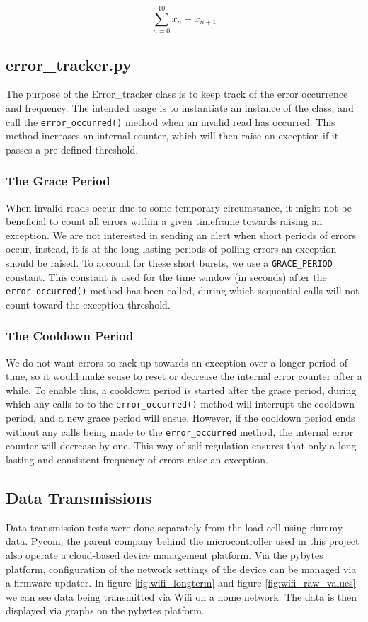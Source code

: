 $$\sum_{n=0}^{10} x_n - x_{n+1}$$


\subsection{error\_tracker.py}
The purpose of the Error\_tracker class is to keep track of the error occurrence and frequency. The intended usage is to instantiate an instance of the class, and call the \lstinline{error_occurred()} method when an invalid read has occurred. This method increases an internal counter, which will then raise an exception if it passes a pre-defined threshold.

\subsubsection{The Grace Period}
When invalid reads occur due to some temporary circumstance, it might not be beneficial to count all errors within a given timeframe towards raising an exception. We are not interested in sending an alert when short periods of errors occur, instead, it is at the long-lasting periods of polling errors an exception should be raised. To account for these short bursts, we use a \lstinline{GRACE_PERIOD} constant. This constant is used for the time window (in seconds) after the \lstinline{error_occurred()} method has been called, during which sequential calls  will not count toward the exception threshold.

\subsubsection{The Cooldown Period}
We do not want errors to rack up towards an exception over a longer period of time, so it would make sense to reset or decrease the internal error counter after a while. To enable this, a cooldown period is started after the grace period, during which any calls to to the \lstinline{error_occurred()} method will interrupt the cooldown period, and a new grace period will ensue. However, if the cooldown period ends without any calls being made to the \lstinline{error_occurred} method, the internal error counter will decrease by one. This way of self-regulation ensures that only a long-lasting and consistent frequency of errors raise an exception.


\subsection{Data Transmissions}
Data transmission tests were done separately from the load cell using dummy data. Pycom, the parent company behind the microcontroller used in this project also operate a cloud-based device management platform. \cite{pybytes-website} Via the pybytes platform, configuration of the network settings of the device can be managed via a firmware updater. 
In figure \ref{fig:wifi_longterm} and figure \ref{fig:wifi_raw_values} we can see data being transmitted via Wifi on a home network. The data is then displayed via graphs on the pybytes platform.

